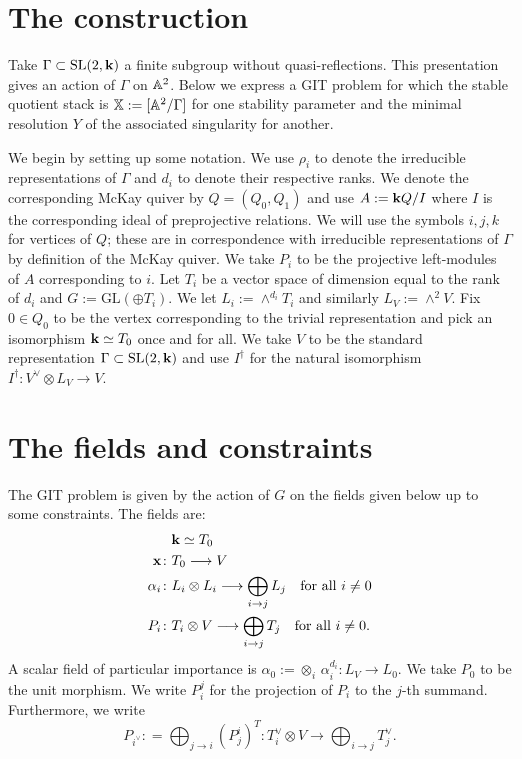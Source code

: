 \documentclass{amsart}
\theoremstyle{definition}
\begin{document}
\section{The construction}
Take $\Gamma \subset \operatorname{SL}(2,\mathbf{k})$ a finite subgroup without quasi-reflections.
This presentation gives an action of $\Gamma$ on $\mathbb{A}^2$.
Below we express a GIT problem for which the stable quotient stack is $\mathbb{X}:= [\mathbb{A}^2/ \Gamma]$ for one stability parameter and the minimal resolution $Y$ of the associated singularity for another.

We begin by setting up some notation.
We use $\rho_i$ to denote the irreducible representations of $\Gamma$ and $d_i$ to denote their respective ranks.
We denote the corresponding McKay quiver by $Q = (Q_0, Q_1)$ and use $A:= \mathbf{k} Q/I$ where $I$ is the corresponding ideal of preprojective relations.
We will use the symbols $i,j,k$ for vertices of $Q$; these are in correspondence with irreducible representations of $\Gamma$ by definition of the McKay quiver.
We take $P_i$ to be the projective left-modules of $A$ corresponding to $i$.
Let $T_i$ be a vector space of dimension equal to the rank of $d_i$ and $G:= \text{GL}(\oplus T_i)$.
We let $L_i:= \wedge^{d_i} T_i$ and similarly $L_V:= \wedge^2 V$.
Fix $0 \in Q_0$ to be the vertex corresponding to the trivial representation and pick an isomorphism $\mathbf{k} \simeq T_0$ once and for all.
We take $V$ to be the standard representation $\Gamma \subset \operatorname{SL}(2,\mathbf{k})$ and use $I^\dagger$ for the natural isomorphism $I^\dagger \colon V^\vee \otimes L_V \rightarrow V$.

\section{The fields and constraints}
The GIT problem is given by the action of $G$ on the fields given below up to some constraints.
The fields are:
\begin{align}
    &\mathbf{k} \simeq T_0 \\
\mathbf{x} \colon &T_0 \longrightarrow V \label{fd:x} \\
\alpha_i \colon &L_i \otimes L_i \longrightarrow \bigoplus_{i \rightarrow j} L_j \quad \text{for all} \,\, i\neq 0 \label{fd:alpha} \\
 P_i \colon &T_i \otimes V \longrightarrow \bigoplus_{i \rightarrow j} T_j \quad \text{for all} \,\, i\neq 0. \label{fd:P}
\end{align}
A scalar field of particular importance is $\alpha_0:= \otimes_i \,\alpha_i^{d_i}: L_V \rightarrow L_0$.
We take $P_0$ to be the unit morphism.
We write $P_i^j$ for the projection of $P_i$ to the $j$-th summand. 
Furthermore, we write $$ P_{i^\vee}: = \bigoplus_{j \rightarrow i} (P_j^i)^T \colon T_i^\vee \otimes V \longrightarrow \bigoplus_{i \rightarrow j} T_j^\vee.$$
\end{document}
